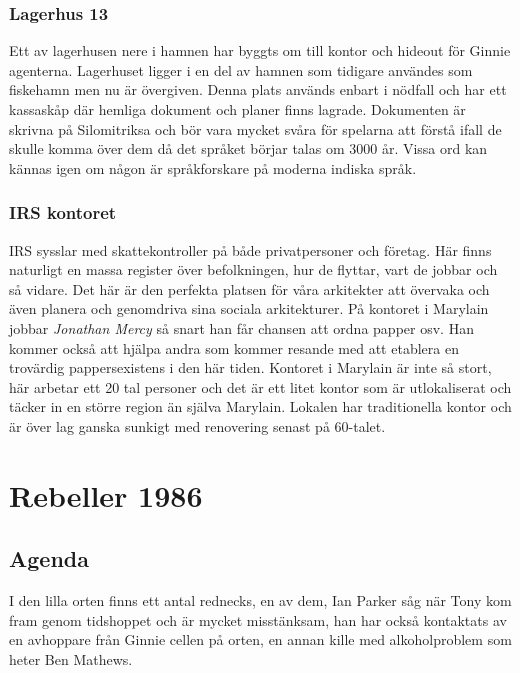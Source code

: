 \documentclass[a5paper,10pt]{report}
\begin{document}
\subsubsection{Lagerhus 13}
Ett av lagerhusen nere i hamnen har byggts om till kontor och hideout för Ginnie agenterna. Lagerhuset ligger i en del av hamnen som tidigare användes som fiskehamn men nu är övergiven. Denna plats används enbart i nödfall och har ett kassaskåp där hemliga dokument och planer finns lagrade. Dokumenten är skrivna på Silomitriksa och bör vara mycket svåra för spelarna att förstå ifall de skulle komma över dem då det språket börjar talas om 3000 år. Vissa ord kan kännas igen om någon är språkforskare på moderna indiska språk.
\subsubsection{IRS kontoret}
IRS sysslar med skattekontroller på både privatpersoner och företag. Här finns naturligt en massa register över befolkningen, hur de flyttar, vart de jobbar och så vidare. Det här är den perfekta platsen för våra arkitekter att övervaka och även planera och genomdriva sina sociala arkitekturer. På kontoret i Marylain jobbar \textit{Jonathan Mercy} så snart han får chansen att ordna papper osv. Han kommer också att hjälpa andra som kommer resande med att etablera en trovärdig pappersexistens i den här tiden. Kontoret i Marylain är inte så stort, här arbetar ett 20 tal personer och det är ett litet kontor som är utlokaliserat och täcker in en större region än själva Marylain. Lokalen har traditionella kontor och är över lag ganska sunkigt med renovering senast på 60-talet.
\section{Rebeller 1986}
\subsection{Agenda}
I den lilla orten finns ett antal rednecks, en av dem, Ian Parker såg när Tony kom fram genom tidshoppet och är mycket misstänksam, han har också kontaktats av en avhoppare från Ginnie cellen på orten, en annan kille med alkoholproblem som heter Ben Mathews.
\end{document}
